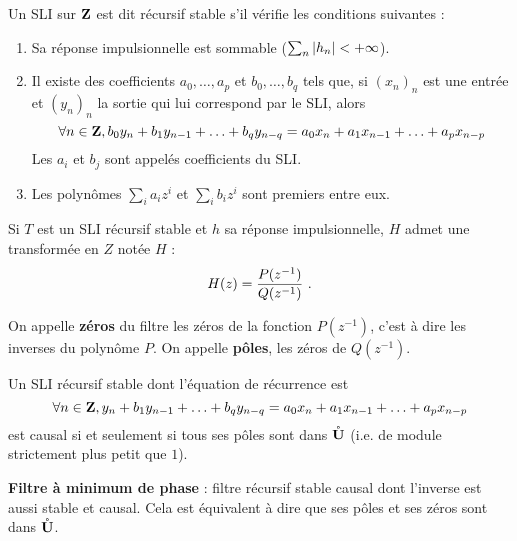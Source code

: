 \begin{defn}
	Un SLI sur $\mathbf{Z}$ est dit récursif stable s'il vérifie les conditions suivantes :
	\begin{enumerate}
	\item
		Sa réponse impulsionnelle est sommable ($\sum_n \left\lvert h_n\right\rvert < + \infty$).
	\item
		Il existe des coefficients $a_0,\ldots,a_p$ et $b_0,\ldots,b_q$ tels que, si $(x_n)_n$ est une entrée et $(y_n)_n$ la sortie qui lui correspond par le SLI, alors
		\vspace{-0.15cm}$$
		\forall n \in \Z, b_0 y_n + b_1 y_{n - 1} + \ldots + b_q y_{n - q} = a_0 x_n + a_1 x_{n - 1} + \ldots + a_p x_{n - p}
		\vspace{-0.15cm}$$
		Les $a_i$ et $b_j$ sont appelés coefficients du SLI.
	\item
		Les polynômes $\sum_i a_i z^i$ et $\sum_i b_i z^i$ sont premiers entre eux.
	\end{enumerate}
\end{defn}

\begin{pop}
	Si $T$ est un SLI récursif stable et $h$ sa réponse impulsionnelle, $H$ admet une transformée en $Z$ notée $H$ :
	\vspace{-0.15cm}$$
	H(z) = \frac{P(z^{-1})}{Q(z^{-1})}\ .
	\vspace{-0.15cm}$$
\end{pop}

\begin{defn}
	On appelle \textbf{zéros} du filtre les zéros de la fonction $P(z^{-1})$, c'est à dire les inverses du polynôme $P$.
	On appelle \textbf{pôles}, les zéros de $Q(z^{-1})$.
\end{defn}

\begin{pop}
	Un SLI récursif stable dont l'équation de récurrence est
	\vspace{-0.15cm}$$
	\forall n \in \Z, y_n + b_1 y_{n - 1} + \ldots + b_q y_{n - q} = a_0 x_n + a_1 x_{n - 1} + \ldots + a_p x_{n - p}
	\vspace{-0.15cm}$$
	est causal si et seulement si tous ses pôles sont dans $\mathring{\mathbf{U}}$ (i.e. de module strictement plus petit que $1$).
\end{pop}

\begin{defn}
	\textbf{Filtre à minimum de phase} : filtre récursif stable causal dont l'inverse est aussi stable et causal.
	Cela est équivalent à dire que ses pôles et ses zéros sont dans $\mathring{\mathbf{U}}$.
\end{defn}